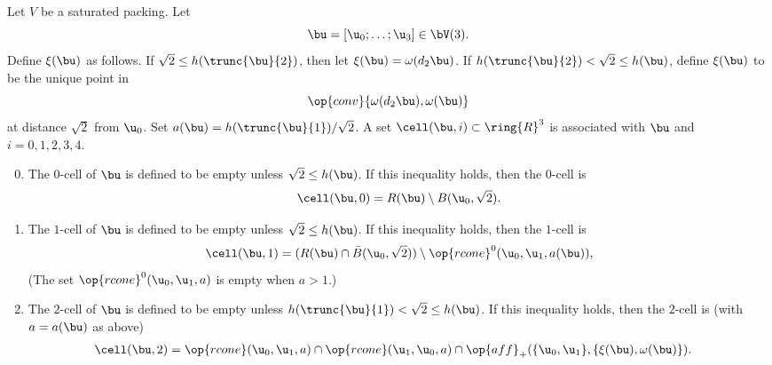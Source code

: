 \begin{definition} 
  Let $V$ be a saturated packing.  Let 
\[
\bu=[\u_0;\ldots;\u_3]\in
  \bV(3).
\]
  Define $\xi(\bu)$ as follows.  If $\sqrt2\le
  h(\trunc{\bu}{2})$, then let $\xi(\bu)=\omega(d_2\bu)$.  If
  $h(\trunc{\bu}{2})<\sqrt2\le h(\bu)$, define $\xi(\bu)$
  to be the unique point in
\[
\op{conv}\{\omega(d_2\bu),\omega(\bu)\}
\]
at distance $\sqrt2$ from $\u_0$.  
Set $a(\bu)={h(\trunc{\bu}{1})}/{\sqrt2}$.
A set $\cell(\bu,i)\subset\ring{R}^3$ is associated with $\bu$ and
$i=0,1,2,3,4$.  \hfill\break\smallskip
\begin{enumerate}
\setcounter{enumi}{-1}
\item %
The $0$-cell of $\bu$ is defined to be empty unless $\sqrt2 \le h(\bu)$.
If this inequality holds, then the $0$-cell is
\[  
\cell(\bu,0) = R(\bu)\setminus B(\u_0,\sqrt2).%
\] 
\bigskip
\item The $1$-cell of $\bu$ is defined to be empty unless $\sqrt2 \le
  h(\bu)$.  If this inequality holds, then the $1$-cell is
\[  
\cell(\bu,1) = (R(\bu) \cap  \bar B(\u_0,\sqrt2))
\setminus \op{rcone}^0(\u_0,\u_1,a(\bu)),
\] 
(The set $\op{rcone}^0(\u_0,\u_1,a)$ is empty when $a>1$.)
\bigskip
\item The $2$-cell of $\bu$ is defined to be empty unless
  $h(\trunc{\bu}{1})<\sqrt2\le h(\bu)$.  If this inequality holds,
  then the $2$-cell is (with $a=a(\bu)$ as above)
\begin{align*} 
\cell(\bu,2) &= 
 \op{rcone}(\u_0,\u_1,a)\cap \op{rcone}(\u_1,\u_0,a)\cap 
\op{aff}_+(\{\u_0,\u_1\},\{\xi(\bu),\omega(\bu)\}).

\end{align*}
\end{enumerate}
\end{definition}
